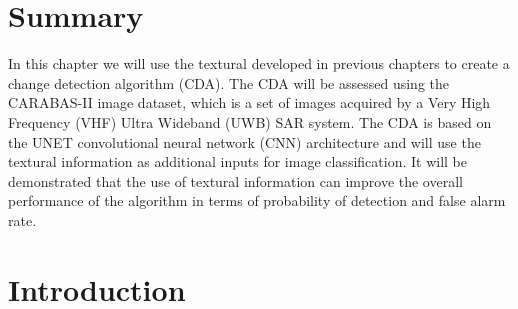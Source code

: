 \section{Summary}
In this chapter we will use the textural developed in previous chapters 
to create a change detection algorithm (CDA). The CDA will be assessed
using the CARABAS-II image dataset, which is a set of images acquired by a Very High Frequency (VHF) Ultra Wideband (UWB) SAR system.
The CDA is based on the UNET convolutional neural network (CNN) architecture and will use the 
textural information as additional inputs for image classification.
It will be demonstrated that the 
use of textural information can improve the overall performance of the algorithm
in terms of probability of detection and false alarm rate. 

\section{Introduction}

